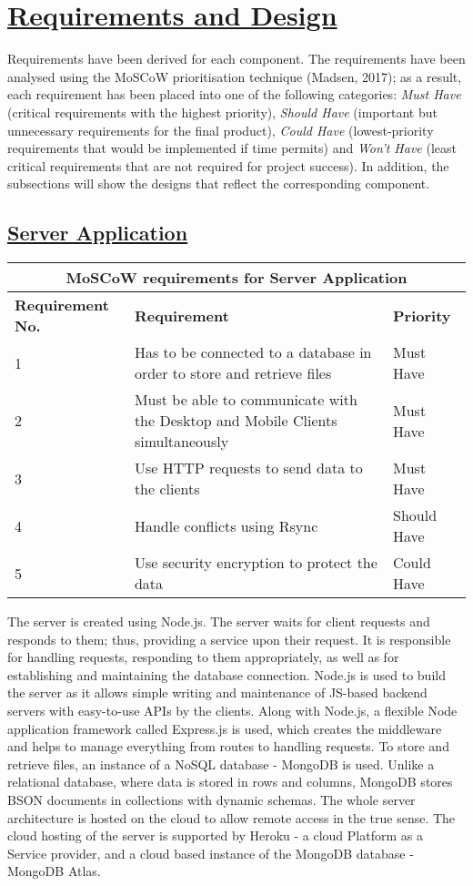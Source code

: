 \documentclass{article}
\begin{document}
\section{\underline{Requirements and Design}}
Requirements have been derived for each component. The requirements have been analysed using the MoSCoW prioritisation technique (Madsen, 2017); as a result, each requirement has been placed into one of the following categories: \textit{Must Have} (critical requirements with the highest priority), \textit{Should Have} (important but unnecessary requirements for the final product), \textit{Could Have} (lowest-priority requirements that would be implemented if time permits) and \textit{Won't Have} (least critical requirements that are not required for project success). In addition, the subsections will show the designs that reflect the corresponding component.

\subsection{\underline{Server Application}}

\begin{tabular}{|p{3cm}|p{5cm}|p{4cm}|}
\hline
\multicolumn{3}{|c|}{\textbf{MoSCoW requirements for Server Application}} \\
\hline
\textbf{Requirement No.} & \textbf{Requirement} & \textbf{Priority}\\
\hline
1 & Has to be connected to a database in order to store and retrieve files & Must Have \\
\hline
2 & Must be able to communicate with the Desktop and Mobile Clients simultaneously & Must Have \\
\hline
3 & Use HTTP requests to send data to the clients & Must Have \\
\hline
4 & Handle conflicts using Rsync & Should Have \\
\hline
5 & Use security encryption to protect the data & Could Have\\
\hline
\end{tabular}

The server is created using Node.js. The server waits for client requests and responds to them; thus, providing a service upon their request. It is responsible for handling requests, responding to them appropriately, as well as for establishing and maintaining the database connection. Node.js is used to build the server as it allows simple writing and maintenance of JS-based backend servers with easy-to-use APIs by the clients. Along with Node.js, a flexible Node application framework called Express.js is used, which creates the middleware and helps to manage everything from routes to handling requests. To store and retrieve files, an instance of a NoSQL database - MongoDB is used. Unlike a relational database, where data is stored in rows and columns, MongoDB stores BSON documents in collections with dynamic schemas. The whole server architecture is hosted on the cloud to allow remote access in the true sense. The cloud hosting of the server is supported by Heroku - a cloud Platform as a Service provider, and a cloud based instance of the MongoDB database - MongoDB Atlas.
\end{document}
